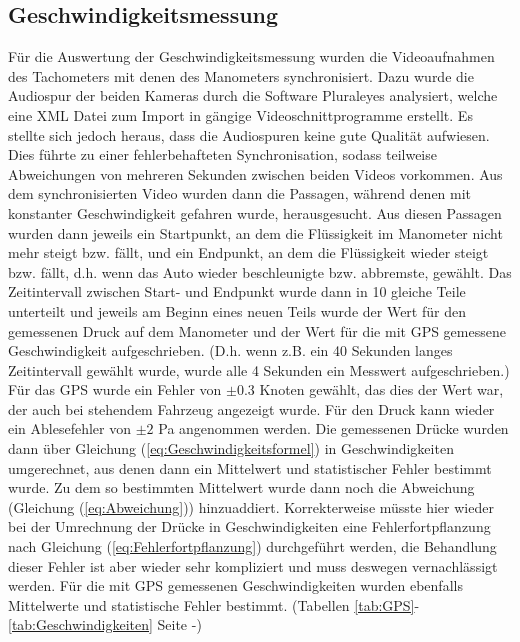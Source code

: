 \subsection{Geschwindigkeitsmessung}
Für die Auswertung der Geschwindigkeitsmessung wurden die Videoaufnahmen des Tachometers mit denen des Manometers synchronisiert. Dazu wurde die Audiospur der beiden Kameras durch die Software Pluraleyes analysiert, welche eine XML Datei zum Import in gängige Videoschnittprogramme erstellt. Es stellte sich jedoch heraus, dass die Audiospuren keine gute Qualität aufwiesen. Dies führte zu einer fehlerbehafteten Synchronisation, sodass teilweise Abweichungen von mehreren Sekunden zwischen beiden Videos vorkommen.
Aus dem synchronisierten Video wurden dann die Passagen, während denen mit konstanter Geschwindigkeit gefahren wurde, herausgesucht. Aus diesen Passagen wurden dann jeweils ein Startpunkt, an dem die Flüssigkeit im Manometer nicht mehr steigt bzw. fällt, und ein Endpunkt, an dem die Flüssigkeit wieder steigt bzw. fällt, d.h. wenn das Auto wieder beschleunigte bzw. abbremste, gewählt. Das Zeitintervall zwischen Start- und Endpunkt wurde dann in 10 gleiche Teile unterteilt und jeweils am Beginn eines neuen Teils wurde der Wert für den gemessenen Druck auf dem Manometer und der Wert für die mit GPS gemessene Geschwindigkeit aufgeschrieben. (D.h. wenn z.B. ein 40 Sekunden langes Zeitintervall gewählt wurde, wurde alle 4 Sekunden ein Messwert aufgeschrieben.)
\\
Für das GPS wurde ein Fehler von $\pm 0.3$ Knoten gewählt, das dies der Wert war, der auch bei stehendem Fahrzeug angezeigt wurde. Für den Druck kann wieder ein Ablesefehler von $\pm 2$ Pa angenommen werden. Die gemessenen Drücke wurden dann über Gleichung (\ref{eq:Geschwindigkeitsformel}) in Geschwindigkeiten umgerechnet, aus denen dann ein Mittelwert und statistischer Fehler bestimmt wurde. Zu dem so bestimmten Mittelwert wurde dann noch die Abweichung (Gleichung (\ref{eq:Abweichung})) hinzuaddiert. Korrekterweise müsste hier wieder bei der Umrechnung der Drücke in Geschwindigkeiten eine Fehlerfortpflanzung nach Gleichung (\ref{eq:Fehlerfortpflanzung}) durchgeführt werden, die Behandlung dieser Fehler ist aber wieder sehr kompliziert und muss deswegen vernachlässigt werden. Für die mit GPS gemessenen Geschwindigkeiten wurden ebenfalls Mittelwerte und statistische Fehler bestimmt. (Tabellen \ref{tab:GPS}-\ref{tab:Geschwindigkeiten} Seite \pageref{tab:GPS}-\pageref{tab:Geschwindigkeiten})
\\
